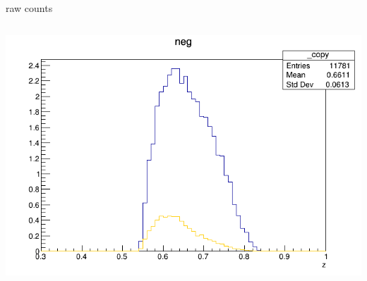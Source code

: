 \begin{frame}{raw counts}
\begin{columns}
\begin{column}[T]{0.25\textwidth}
\includegraphics[width = \textwidth]{results/yield/statistics/yield_x_Q2_z_0.55_5.500_0.65_neg.png}
\end{column}
\end{columns}
\end{frame}
